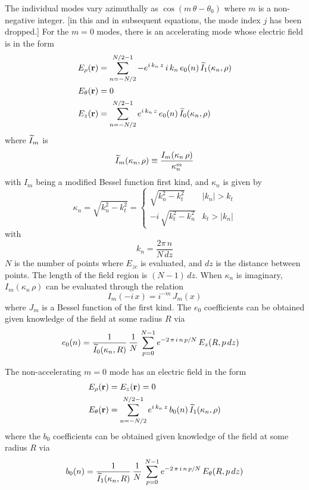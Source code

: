 The individual modes vary azimuthally as $\cos(m \, \theta - \theta_0)$ where $m$ is a non-negative
integer.  [in this and in subsequent equations, the mode index $j$ has been dropped.]  For the $m =
0$ modes, there is an accelerating mode whose electric field is in the form
\begin{align}
  E_\rho({\bf r}) &= \sum_{n=-N/2}^{N/2-1} -e^{i \, k_n \, z} \, 
    i \, k_n \, e_0(n) \, \widetilde I_1(\kappa_n, \rho) \nonumber \\
  E_\theta({\bf r}) &= 0 \\
  E_z({\bf r}) &= \sum_{n=-N/2}^{N/2-1}e^{i \, k_n \, z} \, 
    e_0(n) \, \widetilde I_0(\kappa_n, \rho) \nonumber
\end{align}
where $\widetilde I_m$ is
\begin{equation}
  \widetilde I_m (\kappa_n, \rho) \equiv \frac{I_m(\kappa_n \, \rho)}{\kappa_n^m}
\end{equation}
with $I_m$ being a modified Bessel function first kind, and $\kappa_n$ is given by
\begin{equation}
  \kappa_n = \sqrt{k_n^2 - k_t^2} = 
  \begin{cases}
    \sqrt{k_n^2 - k_t^2} & |k_n| > k_t \\
    -i \, \sqrt{k_t^2 - k_n^2} & k_t > |k_n|
  \end{cases}
\end{equation}
with
\begin{equation}
  k_n = \frac{2 \pi \, n}{N \, dz}
\end{equation}
$N$ is the number of points where $E_{zc}$ is evaluated, and $dz$ is
the distance between points. The length of the field region is $(N-1) \, dz$. When
$\kappa_n$ is imaginary, $I_m(\kappa_n \, \rho)$ can be evaluated
through the relation
\begin{equation}
  I_m(-i \, x) = i^{-m} \, J_m(x)
\end{equation}
where $J_m$ is a Bessel function of the first kind.
The $e_0$ coefficients can be obtained given knowledge of the field at some radius $R$ via
\begin{align}
  e_0(n) &= \frac{1}{\widetilde I_0(\kappa_n, R)} \, \frac{1}{N} \, \sum_{p=0}^{N-1}
    e^{-2 \, \pi \, i \, n \, p / N} \, E_{z}(R, p \, dz)
\end{align}

The non-accelerating $m = 0$ mode has an electric field in the form
\begin{align}
  E_\rho({\bf r}) &= E_z({\bf r}) = 0 \nonumber \\
  E_\theta({\bf r}) &= \sum_{n=-N/2}^{N/2-1}e^{i \, k_n \, z} \, 
    b_0(n) \, \widetilde I_1(\kappa_n, \rho)
\end{align}
where the $b_0$ coefficients can be obtained given knowledge of the field at some radius $R$ via
\begin{equation}
  b_0(n) = \frac{1}{\widetilde I_1(\kappa_n, R)} \, \frac{1}{N} \, \sum_{p=0}^{N-1}
    e^{-2 \, \pi \, i \, n \, p / N} \, E_{\theta}(R, p \, dz)
\end{equation}

